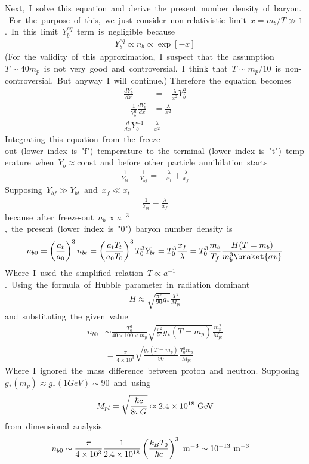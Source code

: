 Next,\ I\ solve\ this\ equation\ and\ derive\ the\ present\ number\ density\ of\ baryon.\ For\ the\ purpose\ of\ this,\ we\ just\ consider\ non-relativistic\ limit\ $x=m_b/T\gg1$.\ In\ this\ limit\ $Y_b^{eq}$\ term\ is\ negligible\ because
\begin{align*}
    Y_b^{eq}\propto n_b\propto\exp[-x]
\end{align*}
(For\ the\ validity\ of\ this\ approximation,\ I\ suspect\ that\ the\ assumption\ $T\sim40m_p$\ is\ not\ very\ good\ and\ controversial.\ I\ think\ that\ $T\sim m_p/10$\ is\ non-controversial.\ But\ anyway\ I\ will\ continue.)
Therefore\ the\ equation\ becomes
\begin{align*}
    \frac{dY_b}{dx}&=-\frac{\lambda}{x^2}Y_b^2\\
    -\frac{1}{Y_b^2}\frac{dY_b}{dx}&=\frac{\lambda}{x^2}\\
    \frac{d}{dx}Y_b^{-1}&\frac{\lambda}{x^2}
\end{align*}
Integrating\ this\ equation\ from\ the\ freeze-out\ (lower\ index\ is\ "f")\ temperature\ to\ the\ terminal\ (lower\ index\ is\ "t")\ temperature\ when\ $Y_b\approx$const\ and\ before\ other\ particle\ annihilation\ starts
\begin{align*}
    \frac{1}{Y_{bt}}-\frac{1}{Y_{bf}}=-\frac{\lambda}{x_t}+\frac{\lambda}{x_f}
\end{align*}
Supposing\ $Y_{bf}\gg Y_{bt}$\ and\ $x_f\ll x_t$
\begin{align*}
    \frac{1}{Y_{bt}}=\frac{\lambda}{x_f}
\end{align*}
because\ after\ freeze-out\ $n_b\propto a^{-3}$,\ the\ present\ (lower\ index\ is\ "0")\ baryon\ number\ density\ is
\begin{align*}
    n_{b0}=\left(\frac{a_t}{a_0}\right)^3n_{bt}=\left(\frac{a_tT_t}{a_0T_0}\right)^3T_0^3Y_{bt}=T_{0}^3\frac{x_f}{\lambda}=T^3_0\frac{m_b}{T_f}\frac{H(T=m_b)}{m_b^3\braket{\sigma v}}
\end{align*}
Where\ I\ used\ the\ simplified\ relation\ $T\propto a^{-1}$.\ Using\ the\ formula\ of\ Hubble\ parameter\ in\ radiation\ dominant
\begin{align*}
    H\approx\sqrt{\frac{\pi^2}{90}g_*}\frac{T^2}{M_{pl}}
\end{align*}
and\ substituting\ the\ given\ value
\begin{align*}
    n_{b0}&\sim \frac{T^3_0}{40\times100\times m_p}\sqrt{\frac{\pi^2}{90}g_*(T=m_p)}\frac{m_p^2}{M_{pl}}\\
    &=\frac{\pi}{4\times10^3}\sqrt{\frac{g_*(T=m_p)}{90}}\frac{T^3_0m_p}{M_{pl}}
\end{align*}
Where\ I\ ignored\ the\ mass\ difference\ between\ proton\ and\ neutron.\ Supposing\ $g_*(m_p)\approx g_*(1GeV)\sim90$\ and\ using
\begin{align*}
    M_{pl}=\sqrt{\frac{\hbar c}{8\pi G}}\approx2.4\times10^{18}\ \rm{GeV}
\end{align*}
from\ dimensional\ analysis
\begin{align}
    n_{b0}&\sim\frac{\pi}{4\times10^3}\frac{1}{2.4\times10^{18}}\left(\frac{k_BT_0}{\hbar c}\right)^3\ \rm{m^{-3}}\sim10^{-13}\ \rm{m^{-3}}
\end{align}

